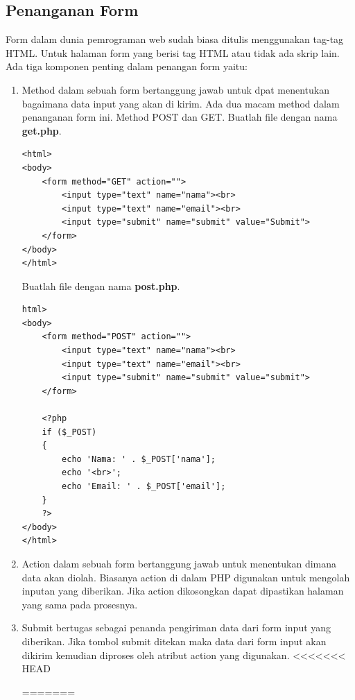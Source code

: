 \subsection{Penanganan Form}
Form dalam dunia pemrograman web sudah biasa ditulis menggunakan tag-tag HTML. Untuk halaman form yang berisi tag HTML atau tidak ada skrip lain. Ada tiga komponen penting dalam penangan form yaitu:
\begin{enumerate}
\item Method dalam sebuah form bertanggung jawab untuk dpat menentukan bagaimana data input yang akan di kirim. Ada dua macam method dalam penanganan form ini. Method POST dan GET. Buatlah file dengan nama \textbf{get.php}.
\begin{lstlisting}
<html>
<body>
	<form method="GET" action="">
		<input type="text" name="nama"><br>
		<input type="text" name="email"><br>
		<input type="submit" name="submit" value="Submit">
	</form>
</body>
</html>
\end{lstlisting}
Buatlah file dengan nama \textbf{post.php}.
\begin{lstlisting}
html>
<body>
	<form method="POST" action="">
		<input type="text" name="nama"><br>
		<input type="text" name="email"><br>
		<input type="submit" name="submit" value="submit">
	</form>

	<?php
	if ($_POST)
	{
		echo 'Nama: ' . $_POST['nama'];
		echo '<br>';
		echo 'Email: ' . $_POST['email'];
	}
	?>
</body>
</html>
\end{lstlisting}
\item Action dalam sebuah form bertanggung jawab untuk menentukan dimana data akan diolah. Biasanya action di dalam PHP digunakan untuk mengolah inputan yang diberikan. Jika action dikosongkan dapat dipastikan halaman yang sama pada prosesnya.
\item Submit bertugas sebagai penanda pengiriman data dari form input yang diberikan. Jika tombol submit ditekan maka data dari form input akan dikirim kemudian diproses oleh atribut action yang digunakan.
<<<<<<< HEAD



=======
\end{enumerate}

